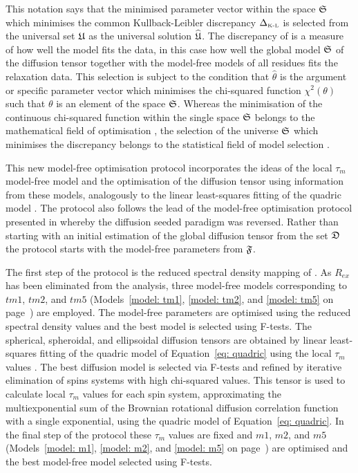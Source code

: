 \begin{htmlonly}
\begin{htmlonly}
\noindent This notation says that the minimised parameter vector within the space $\mathfrak{S}$ which minimises the common Kullback-Leibler discrepancy $\Delta_{\scriptscriptstyle \text{K-L}}$ is selected from the universal set $\mathfrak{U}$ as the universal solution $\widehat{\mathfrak{U}}$.  The discrepancy of \citet{KullbackLeibler51} is a measure of how well the model fits the data, in this case how well the global model $\mathfrak{S}$ of the diffusion tensor together with the model-free models of all residues fits the relaxation data.  This selection is subject to the condition that $\hat\theta$ is the argument or specific parameter vector which minimises the chi-squared function $\chi^2(\theta)$ such that $\theta$ is an element of the space $\mathfrak{S}$.  Whereas the minimisation of the continuous chi-squared function within the single space $\mathfrak{S}$ belongs to the mathematical field of optimisation \citep{NocedalWright99}, the selection of the universe $\mathfrak{S}$ which minimises the discrepancy belongs to the statistical field of model selection \citep{Akaike73,Schwarz78,LinhartZucchini86,Zucchini00,dAuvergneGooley03}.

This new model-free optimisation protocol incorporates the ideas of the local $\tau_m$ model-free model \citep{Barbato92, Schurr94} and the optimisation of the diffusion tensor using information from these models, analogously to the linear least-squares fitting of the quadric model \citep{Bruschweiler95, Lee97}.  The protocol also follows the lead of the model-free optimisation protocol presented in \citet{Butterwick04} whereby the diffusion seeded paradigm was reversed.  Rather than starting with an initial estimation of the global diffusion tensor from the set $\mathfrak{D}$ the protocol starts with the model-free parameters from $\mathfrak{F}$.

The first step of the \citet{Butterwick04} protocol is the reduced spectral density mapping of \citet{Farrow95}.  As $R_{ex}$ has been eliminated from the analysis, three model-free models corresponding to $tm1$, $tm2$, and $tm5$ (Models~\ref{model: tm1}, \ref{model: tm2}, and \ref{model: tm5} on page~\pageref{model: tm1}) are employed.  The model-free parameters are optimised using the reduced spectral density values and the best model is selected using F-tests.  The spherical, spheroidal, and ellipsoidal diffusion tensors are obtained by linear least-squares fitting of the quadric model of Equation~\eqref{eq: quadric} using the local $\tau_m$ values \citep{Bruschweiler95, Lee97}.  The best diffusion model is selected via F-tests and refined by iterative elimination of spins systems with high chi-squared values.  This tensor is used to calculate local $\tau_m$ values for each spin system, approximating the multiexponential sum of the Brownian rotational diffusion correlation function with a single exponential, using the quadric model of Equation~\eqref{eq: quadric}.  In the final step of the protocol these $\tau_m$ values are fixed and $m1$, $m2$, and $m5$ (Models~\ref{model: m1}, \ref{model: m2}, and \ref{model: m5} on page~\pageref{model: m1}) are optimised and the best model-free model selected using F-tests.


\end{htmlonly}
\end{htmlonly}
